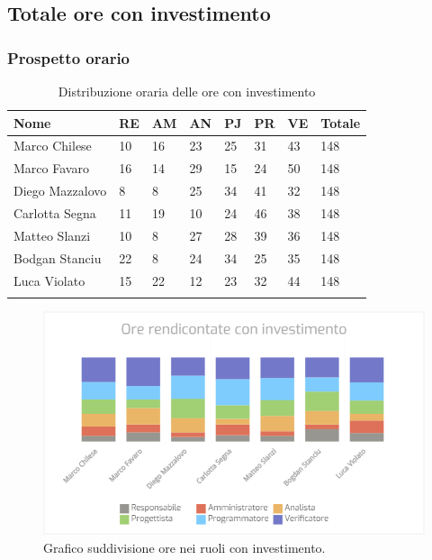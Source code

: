 \subsection{Totale ore con investimento}
\subsubsection{Prospetto orario}


\begin{longtable}{|C{.30\textwidth}|C{.06\textwidth}|C{.06\textwidth}|C{.06\textwidth} | C{.06\textwidth}| C{.06\textwidth} | C{.06\textwidth} | C{.10\textwidth} |}
\hline
\textbf{Nome} & \textbf{RE} & \textbf{AM} & \textbf{AN} & \textbf{PJ} & \textbf{PR} & \textbf{VE} & \textbf{Totale}\\
\hline 
Marco Chilese & 10 & 16 & 23 & 25 & 31 & 43 & 148\\
\hline
Marco Favaro & 16 & 14 & 29 & 15 & 24 & 50 & 148\\
\hline
Diego Mazzalovo & 8 & 8 & 25 & 34 & 41 & 32 & 148\\
\hline
Carlotta Segna & 11 & 19 & 10 & 24 & 46 & 38 & 148\\
\hline
Matteo Slanzi & 10 & 8 & 27 & 28 & 39 & 36 & 148\\
\hline
Bodgan Stanciu & 22 & 8 & 24 & 34 & 25 & 35 & 148\\
\hline
Luca Violato & 15 & 22 & 12 & 23 & 32 & 44 & 148 \\
\hline


\caption{Distribuzione oraria delle ore con investimento}
\label{Distribuzione oraria delle ore con investimento}
\end{longtable}

\begin{figure}[H]
	\centering
  		\includegraphics[width=1\linewidth]{./images/ore_rendicontate_con_investimento.png}
  		\caption{Grafico suddivisione ore nei ruoli con investimento.}
  		\label{fig:grafico suddivione ruoli con investimento}
\end{figure}

